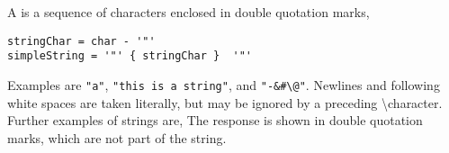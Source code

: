 A  is a sequence of characters enclosed in double quotation marks,
%
\begin{lstlisting}[language=EBNF]
stringChar = char - '"'
simpleString = '"' { stringChar }  '"'
\end{lstlisting}
% 
Examples are \lstinline{"a"}, \lstinline{"this is a string"}, and \lstinline{"-&#\@"}. Newlines and following white spaces are taken literally, but may be ignored by a preceding \textbackslash character. Further examples of strings are,
%
%
The response is shown in double quotation marks, which are not part of the string. 

